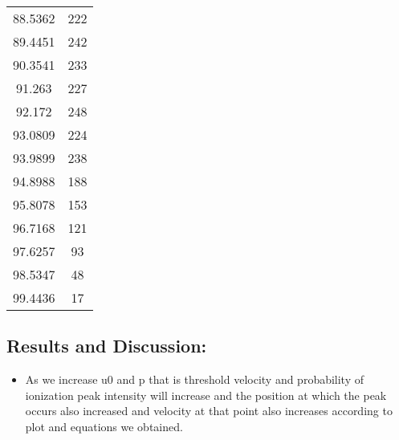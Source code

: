 \documentclass[10pt,a4paper]{article}
\providecommand{\tightlist}{%
      \setlength{\itemsep}{0pt}\setlength{\parskip}{0pt}}
\begin{document}
\begin{table}[H]
\begin{tabular}{|c|c|}
88.5362 & 222 \\
89.4451 & 242 \\
90.3541 & 233 \\
91.263 & 227 \\
92.172 & 248 \\
93.0809 & 224 \\
93.9899 & 238 \\
94.8988 & 188 \\
95.8078 & 153 \\
96.7168 & 121 \\
97.6257 & 93 \\
98.5347 & 48 \\
99.4436 & 17 \\
	\hline
\end{tabular}
\end{table}

    \subsection{Results and Discussion:}\label{results-and-discussion}

\begin{itemize}
\tightlist
\item
  As we increase u0 and p that is threshold velocity and probability of
  ionization peak intensity will increase and the position at which the
  peak occurs also increased and velocity at that point also increases
  according to plot and equations we obtained.
\end{itemize}


    
    
    
    
\end{document}
